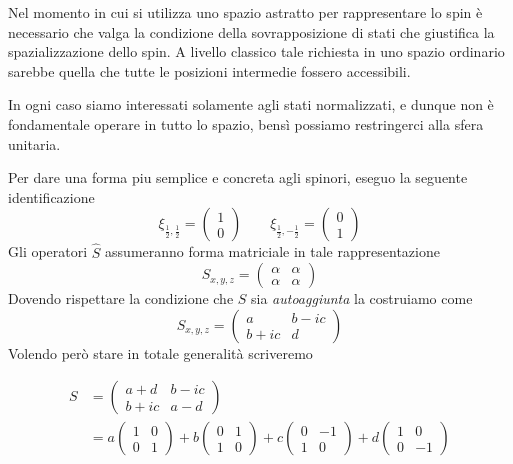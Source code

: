Nel momento in cui si utilizza uno spazio astratto per rappresentare lo
spin è necessario che valga la condizione della sovrapposizione di stati
che giustifica la spazializzazione dello spin.
A livello classico tale
richiesta in uno spazio ordinario sarebbe quella che tutte le posizioni
intermedie fossero accessibili.

In ogni caso siamo interessati solamente agli stati normalizzati, e
dunque non è fondamentale operare in tutto lo spazio, bensì possiamo
restringerci alla sfera unitaria.

Per dare una forma piu semplice e concreta agli spinori, eseguo la
seguente identificazione \[
                             \xi_{\frac{1}{2}, \frac{1}{2}} =
                             \begin{pmatrix}
                                 1 \\ 0
                             \end{pmatrix} \qquad
                             \xi_{\frac{1}{2}, - \frac{1}{2}} =
                             \begin{pmatrix}
                                 0 \\ 1
                             \end{pmatrix}
\] Gli operatori \(\hat{S}\) assumeranno forma matriciale in tale
rappresentazione \[
                     S_{x,y,z} =
                     \begin{pmatrix}
                         \alpha & \alpha \\
                         \alpha & \alpha
                     \end{pmatrix}
\] Dovendo rispettare la condizione che \(S\) sia \emph{autoaggiunta} la
costruiamo come \[
                    S_{x,y,z} =
                    \begin{pmatrix}
                        a & b - ic \\
                        b + ic & d
                    \end{pmatrix}
\] Volendo però stare in totale generalità scriveremo

\begin{align*}
    S &=
    \begin{pmatrix}
        a + d & b-ic  \\
        b+ic & a-d
    \end{pmatrix}    \\
    &=
    a
    \begin{pmatrix}
        1 & 0 \\
        0 & 1
    \end{pmatrix}
    + b \begin{pmatrix}
            0 & 1 \\
            1 & 0
    \end{pmatrix}
    + c \begin{pmatrix}
            0 & -1  \\
            1 & 0
    \end{pmatrix}
    +d \begin{pmatrix}
           1 & 0 \\
           0 & -1
    \end{pmatrix}
\end{align*}

